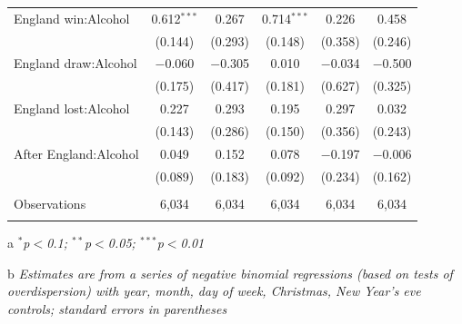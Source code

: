 \documentclass[12pt, letterpaper]{article}
\begin{document}
\begin{table}
{\begin{threeparttable}
\begin{tabular}{@{\extracolsep{5pt}}lccccc}
  England win:Alcohol & 0.612$^{***}$ & 0.267 & 0.714$^{***}$ & 0.226 & 0.458 \\ 
  & (0.144) & (0.293) & (0.148) & (0.358) & (0.246) \\ 
  England draw:Alcohol & $-$0.060 & $-$0.305 & 0.010 & $-$0.034 & $-$0.500 \\ 
  & (0.175) & (0.417) & (0.181) & (0.627) & (0.325) \\ 
  England lost:Alcohol & 0.227 & 0.293 & 0.195 & 0.297 & 0.032 \\ 
  & (0.143) & (0.286) & (0.150) & (0.356) & (0.243) \\ 
  After England:Alcohol & 0.049 & 0.152 & 0.078 & $-$0.197 & $-$0.006 \\ 
  & (0.089) & (0.183) & (0.092) & (0.234) & (0.162) \\ 
  \hline \\[-1.8ex] 
Observations & 6,034 & 6,034 & 6,034 & 6,034 & 6,034 \\ 
\hline 
\hline \\[-1.8ex] 
\end{tabular} 
\begin{tablenotes}
      \item[a] \textit{$^{*}$p$<$0.1; $^{**}$p$<$0.05; $^{***}$p$<$0.01}
      \item[b] \textit{Estimates are from a series of negative binomial regressions (based on tests of overdispersion)  with year, month, day of week, Christmas, New Year's eve controls; standard errors in parentheses}
    \end{tablenotes}
\end{threeparttable} }
\end{table}
\end{document}
